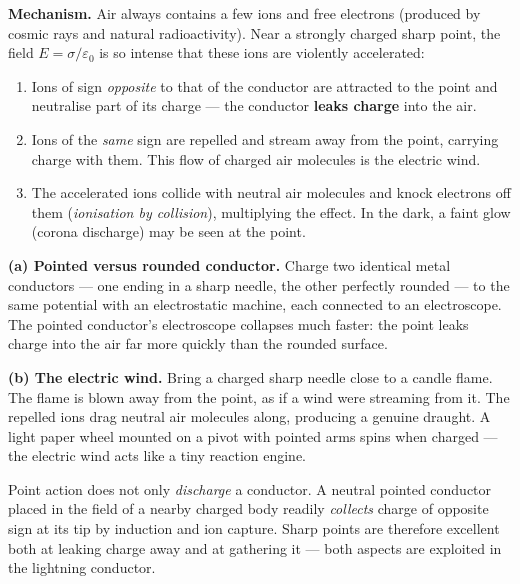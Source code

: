 \documentclass[11pt]{article}
\newcommand{\cle}[1]{{\popxbold\color{popdark}#1}}
\begin{document}
\textbf{Mechanism.} Air always contains a few ions and free electrons (produced by cosmic rays and natural radioactivity). Near a strongly charged sharp point, the field $E = \sigma/\varepsilon_0$ is so intense that these ions are violently accelerated:

\begin{enumerate}
\item Ions of sign \emph{opposite} to that of the conductor are attracted to the point and neutralise part of its charge — the conductor \textbf{leaks charge} into the air.
\item Ions of the \emph{same} sign are repelled and stream away from the point, carrying charge with them. This flow of charged air molecules is the \cle{electric wind}.
\item The accelerated ions collide with neutral air molecules and knock electrons off them (\emph{ionisation by collision}), multiplying the effect. In the dark, a faint glow (corona discharge) may be seen at the point.
\end{enumerate}

\begin{experience}
\textbf{(a) Pointed versus rounded conductor.} Charge two identical metal conductors — one ending in a sharp needle, the other perfectly rounded — to the same potential with an electrostatic machine, each connected to an electroscope. The pointed conductor's electroscope collapses much faster: the point leaks charge into the air far more quickly than the rounded surface.

\textbf{(b) The electric wind.} Bring a charged sharp needle close to a candle flame. The flame is blown away from the point, as if a wind were streaming from it. The repelled ions drag neutral air molecules along, producing a genuine draught. A light paper wheel mounted on a pivot with pointed arms spins when charged — the electric wind acts like a tiny reaction engine.
\end{experience}

\begin{attention}
Point action does not only \emph{discharge} a conductor. A neutral pointed conductor placed in the field of a nearby charged body readily \emph{collects} charge of opposite sign at its tip by induction and ion capture. Sharp points are therefore excellent both at leaking charge away and at gathering it — both aspects are exploited in the lightning conductor.
\end{attention}
\end{document}
